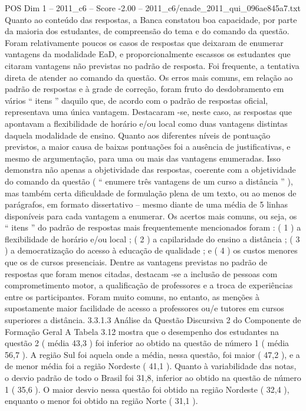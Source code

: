 \begin{textsample}{POS Dim 1 – 2011\_c6 – Score -2.00 – 2011\_c6/enade\_2011\_qui\_096ae845a7.txt}
Quanto ao conteúdo das respostas, a Banca constatou boa capacidade, por parte da maioria dos estudantes, de compreensão do tema e do comando da questão.
Foram relativamente poucos os casos de respostas que deixaram de enumerar vantagens da modalidade EaD, e proporcionalmente escassos os estudantes que citaram vantagens não previstas no padrão de resposta.
Foi frequente, a tentativa direta de atender ao comando da questão.
Os erros mais comuns, em relação ao padrão de respostas e à grade de correção, foram fruto do desdobramento em vários “ itens ” daquilo que, de acordo com o padrão de respostas oficial, representava uma única vantagem.
Destacaram -se, neste caso, as respostas que apontavam a flexibilidade de horário e/ou local como duas vantagens distintas daquela modalidade de ensino.
Quanto aos diferentes níveis de pontuação previstos, a maior causa de baixas pontuações foi a ausência de justificativas, e mesmo de argumentação, para uma ou mais das vantagens enumeradas.
Isso demonstra não apenas a objetividade das respostas, coerente com a objetividade do comando da questão ( “ enumere três vantagens de um curso a distância ” ), mas também certa dificuldade de formulação plena de um texto, ou ao menos de parágrafos, em formato dissertativo – mesmo diante de uma média de 5 linhas disponíveis para cada vantagem a enumerar.
Os acertos mais comuns, ou seja, os “ itens ” do padrão de respostas mais frequentemente mencionados foram : ( 1 ) a flexibilidade de horário e/ou local ; ( 2 ) a capilaridade do ensino a distância ; ( 3 ) a democratização do acesso à educação de qualidade ; e ( 4 ) os custos menores que os de cursos presenciais.
Dentre as vantagens previstas no padrão de respostas que foram menos citadas, destacam -se a inclusão de pessoas com comprometimento motor, a qualificação de professores e a troca de experiências entre os participantes.
Foram muito comuns, no entanto, as menções à supostamente maior facilidade de acesso a professores ou/e tutores em cursos superiores a distância. 3.3.1.3 Análise da Questão Discursiva 2 do Componente de Formação Geral A Tabela 3.12 mostra que o desempenho dos estudantes na questão 2 ( média 43,3 ) foi inferior ao obtido na questão de número 1 ( média 56,7 ).
A região Sul foi aquela onde a média, nessa questão, foi maior ( 47,2 ), e a de menor média foi a região Nordeste ( 41,1 ).
Quanto à variabilidade das notas, o desvio padrão de todo o Brasil foi 31,8, inferior ao obtido na questão de número 1 ( 35,6 ).
O maior desvio nessa questão foi obtido na região Nordeste ( 32,4 ), enquanto o menor foi obtido na região Norte ( 31,1 ).

\end{textsample}
